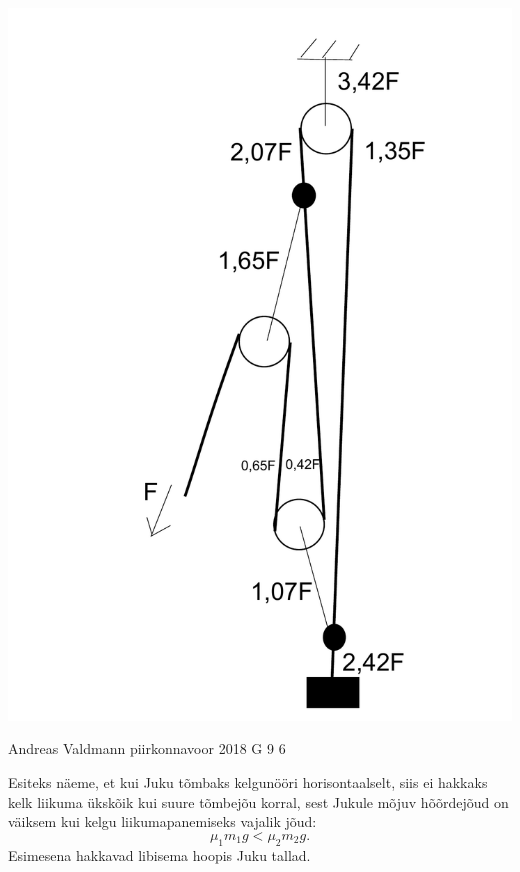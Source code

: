 \documentclass[11pt]{article}
\begin{document}
{{\begin{center}
\includegraphics[scale=0.25]{2014-v3g-06-PolyspastL2}
\end{center}
\fi
}

{Andreas Valdmann} %
{piirkonnavoor} %
{2018} %
{G 9} %
{6} %
{

\ifSolution
Esiteks näeme, et kui Juku tõmbaks kelgunööri horisontaalselt, siis ei hakkaks kelk liikuma ükskõik kui suure tõmbejõu korral, sest Jukule mõjuv hõõrdejõud on väiksem kui kelgu liikumapanemiseks vajalik jõud:
\[
\mu_1 m_1 g < \mu_2 m_2 g.
\]
Esimesena hakkavad libisema hoopis Juku tallad.

}}
\end{document}
